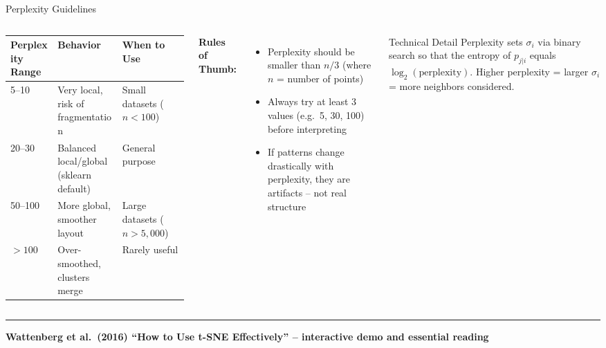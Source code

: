 \documentclass[8pt,aspectratio=169]{beamer}
\newcommand{\bottomnote}[1]{%
\vfill
\vspace{-2mm}
\textcolor{mllavender2}{\rule{\textwidth}{0.4pt}}
\vspace{1mm}
\footnotesize
\textbf{#1}
}
\newenvironment{compactlist}{%
  \begin{itemize}%
    \setlength{\itemsep}{2pt}%
    \setlength{\parskip}{0pt}%
    \setlength{\parsep}{0pt}%
}{%
  \end{itemize}%
}
\begin{document}
\begin{frame}[t]{Perplexity Guidelines}
\begin{columns}[T]
\small

\vspace{1mm}
\footnotesize
\begin{tabular}{@{}l l l@{}}
\toprule
\textbf{Perplexity Range} & \textbf{Behavior} & \textbf{When to Use} \\
\midrule
\rowcolor{mllavender4}
5--10 & Very local, risk of fragmentation & Small datasets ($n < 100$) \\
20--30 & Balanced local/global (sklearn default) & General purpose \\
\rowcolor{mllavender4}
50--100 & More global, smoother layout & Large datasets ($n > 5{,}000$) \\
$> 100$ & Over-smoothed, clusters merge & Rarely useful \\
\bottomrule
\end{tabular}

\vspace{3mm}
\textbf{Rules of Thumb:}
\begin{compactlist}
\item Perplexity should be smaller than $n/3$ (where $n$ = number of points)
\item Always try at least 3 values (e.g.\ 5, 30, 100) before interpreting
\item If patterns change drastically with perplexity, they are artifacts -- not real structure
\end{compactlist}

\begin{block}{Technical Detail}
\scriptsize Perplexity sets $\sigma_i$ via binary search so that the entropy of $p_{j|i}$ equals $\log_2(\text{perplexity})$. Higher perplexity = larger $\sigma_i$ = more neighbors considered.
\end{block}
\end{columns}

\bottomnote{Wattenberg et al.\ (2016) ``How to Use t-SNE Effectively'' -- interactive demo and essential reading}
\end{frame}
\end{document}
